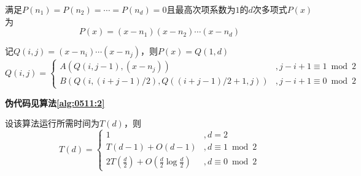 \documentclass[answers]{exam}
\begin{document}
\begin{questions}
    \begin{solution}
        满足$P(n_1)=P(n_2)= \cdots =P(n_d)=0$且最高次项系数为$1$的$d$次多项式$P(x)$为
        \[
            P(x) = (x-n_1)(x-n_2) \cdots (x-n_d)
        \]

        记$Q(i,j) = (x-n_i) \cdots (x-n_j)$，则$P(x) = Q(1,d)$
        \[
            Q(i,j) = \begin{cases}
                A(Q(i,j-1), (x-n_j))                 & , j-i+1 \equiv 1 \bmod 2 \\
                B(Q(i,(i+j-1)/2), Q((i+j-1)/2+1, j)) & , j-i+1 \equiv 0 \bmod 2
            \end{cases}
        \]

        \textbf{伪代码见算法\ref{alg:0511:2}}

        \newcommand{\pp}[1]{ \left( #1 \right) }
        \newcommand{\pb}[1]{ \left[ #1 \right] }
        \newcommand{\pT}[1]{ T\left( #1 \right) }
        \newcommand{\pO}[1]{ O\left( #1 \right) }

        设该算法运行所需时间为$T(d)$，则\[
            T(d) = \begin{cases}
                1                                                     & , d = 2              \\
                \pT{d-1} + \pO{d-1}                                   & , d \equiv 1 \bmod 2 \\
                2\pT{\frac{d}{2}} + \pO{\frac{d}{2} \log \frac{d}{2}} & , d \equiv 0 \bmod 2
            \end{cases}
        \]


\end{solution}
\end{questions}
\end{document}
